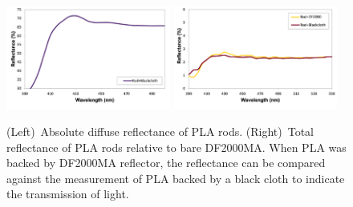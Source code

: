\begin{figure}[h]
\centering
\includegraphics[width=0.48\textwidth]{Figures/PinwheelDiff.png} \quad
\includegraphics[width=0.48\textwidth]{Figures/PinwheelSpec.png}
\caption[Optical measurement on the PLA rods]{(Left)~Absolute diffuse reflectance of PLA
  rods. 
(Right)~Total reflectance of PLA rods relative to bare
  DF2000MA. 
When PLA was backed by DF2000MA reflector, the reflectance can be compared against the measurement of PLA backed by a black cloth to indicate the transmission of light. }
\label{fig:PinwheelOptic}
\end{figure}

